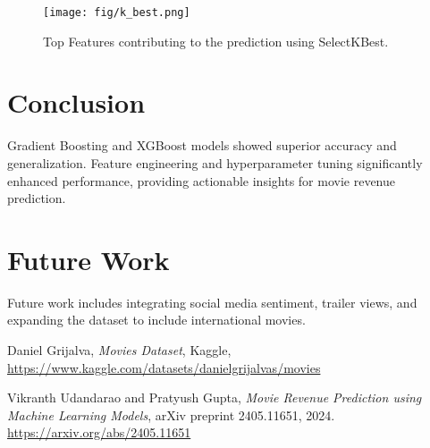 \documentclass[a4paper,12pt]{article}
\begin{document}
\begin{figure}[H]
\centering
\texttt{[image: fig/k\_best.png]}
\caption{Top Features contributing to the prediction using SelectKBest.}
\label{fig:top_features}
\end{figure}

\section{Conclusion}

Gradient Boosting and XGBoost models showed superior accuracy and generalization. Feature engineering and hyperparameter tuning significantly enhanced performance, providing actionable insights for movie revenue prediction.

\section{Future Work}

Future work includes integrating social media sentiment, trailer views, and expanding the dataset to include international movies.


\begin{thebibliography}{9}
Daniel Grijalva,
\textit{Movies Dataset}, Kaggle,
\url{https://www.kaggle.com/datasets/danielgrijalvas/movies}

Vikranth Udandarao and Pratyush Gupta,
\textit{Movie Revenue Prediction using Machine Learning Models},
arXiv preprint 2405.11651, 2024.
\url{https://arxiv.org/abs/2405.11651}
\end{thebibliography}
\end{document}
